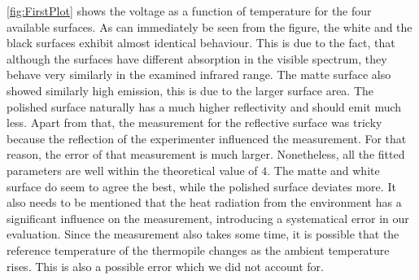 \documentclass[a4paper,10pt,twocolumn]{article}
\begin{document}
    \autoref{fig:FirstPlot} shows the voltage as a function of temperature for the four available surfaces.
    As can immediately be seen from the figure, the white and the black surfaces exhibit almost identical behaviour.
    This is due to the fact, that although the surfaces have different absorption in the visible spectrum, they behave very similarly in the examined infrared range.
    The matte surface also showed similarly high emission, this is due to the larger surface area.
    The polished surface naturally has a much higher reflectivity and should emit much less.
    Apart from that, the measurement for the reflective surface was tricky because the reflection of the experimenter influenced the measurement.
    For that reason, the error of that measurement is much larger.
    Nonetheless, all the fitted parameters are well within the theoretical value of $4$.
    The matte and white surface do seem to agree the best, while the polished surface deviates more.
    It also needs to be mentioned that the heat radiation from the environment has a significant influence on the measurement, introducing a systematical error in our evaluation.
    Since the measurement also takes some time, it is possible that the reference temperature of the thermopile changes as the ambient temperature rises.
    This is also a possible error which we did not account for.
    
    
    
    
\end{document}
